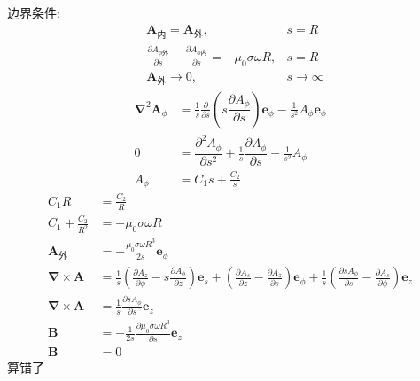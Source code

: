 边界条件:
\begin{align*}
    &\boldsymbol{A}_{\text{内}}=\boldsymbol{A}_{\text{外}},&s=R\\
    &\frac{\partial A_{\phi\text{外}}}{\partial s}-\frac{\partial A_{\phi\text{内}}}{\partial s}=-\mu_0\sigma\omega R,&s=R\\
    &\boldsymbol{A}_\text{外}\to0,&s\to\infty
\end{align*}
\begin{align*}
    \boldsymbol{\nabla}^2\boldsymbol{A}_\phi
&=\frac{1}{s}\frac{\partial}{\partial s}\left(s\dfrac{{\partial A_\phi}}{\partial s}\right)\boldsymbol{e}_\phi
-\frac{1}{s^2}
A_\phi\boldsymbol{e}_\phi\\
0
&=\dfrac{\partial^2 A_\phi}{\partial s^2}
+\frac{1}{s}\dfrac{\partial A_\phi}{\partial s}
-\frac{1}{s^2}
A_\phi\\
A_\phi&=C_1s+\frac{C_2}{s}
\end{align*}
\begin{align*}
    C_1R&=\frac{C_2}{R}\\
    C_1+\frac{C_2}{R^2}&=-\mu_0\sigma\omega R\\
    \boldsymbol{A}_\text{外}&=-\frac{\mu_0\sigma\omega R^3}{2s}\boldsymbol{e}_\phi\\
    \boldsymbol{\nabla}\times\boldsymbol{A}&=\frac{1}{s}\left(\frac{\partial A_{z}}{\partial \phi}-s\frac{\partial A_{\phi}}{\partial z}\right)\boldsymbol{e}_s
    +\left(\frac{\partial A_s}{\partial z}-\frac{\partial A_{z}}{\partial s}\right)\boldsymbol{e}_\phi
    +\frac{1}{s}\left(\frac{\partial sA_{\phi}}{\partial s}
    -\frac{\partial A_s}{\partial \phi}
    \right)\boldsymbol{e}_z\\
        \boldsymbol{\nabla}\times\boldsymbol{A}&=\frac{1}{s}\frac{\partial sA_{\phi}}{\partial s}\boldsymbol{e}_z\\
    \boldsymbol{B}&=-\frac{1}{2s}\frac{\partial \mu_0\sigma\omega R^3}{\partial s}\boldsymbol{e}_z\\
    \boldsymbol{B}&=0
\end{align*}
算错了
\newpage
